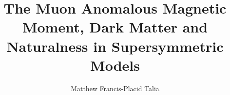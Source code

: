 \documentclass[hyperpdf,bindnopdf]{hepthesis}
\title{The Muon Anomalous Magnetic Moment, Dark Matter and Naturalness in Supersymmetric Models}
\author{Matthew Francis-Placid Talia}
\begin{document}
\raggedbottom %

\begin{frontmatter}
  
\end{frontmatter}

\begin{mainmatter}
  \thispagestyle{plain}
  
  
  
  
  
  
\end{mainmatter}

\begin{appendices}
  
  
  
  
\end{appendices}

\begin{backmatter}
  
\end{backmatter}

\end{document}
